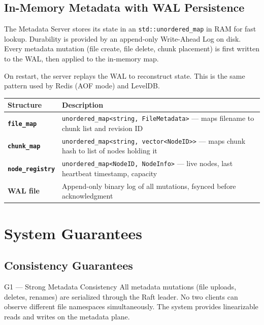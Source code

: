 \documentclass[12pt,a4paper]{article}
\begin{document}
\subsection{In-Memory Metadata with WAL Persistence}

The Metadata Server stores its state in an \texttt{std::unordered\_map} in RAM for fast lookup. Durability is provided by an append-only Write-Ahead Log on disk. Every metadata mutation (file create, file delete, chunk placement) is first written to the WAL, then applied to the in-memory map.

On restart, the server replays the WAL to reconstruct state. This is the same pattern used by Redis (AOF mode) and LevelDB.

\begin{center}
\begin{tabular}{>{\bfseries}p{4cm} p{8cm}}
\toprule
Structure & Description \\
\midrule
\texttt{file\_map} & \texttt{unordered\_map<string, FileMetadata>} — maps filename to chunk list and revision ID \\
\addlinespace
\texttt{chunk\_map} & \texttt{unordered\_map<string, vector<NodeID>>} — maps chunk hash to list of nodes holding it \\
\addlinespace
\texttt{node\_registry} & \texttt{unordered\_map<NodeID, NodeInfo>} — live nodes, last heartbeat timestamp, capacity \\
\addlinespace
WAL file & Append-only binary log of all mutations, fsynced before acknowledgment \\
\bottomrule
\end{tabular}
\end{center}

\section{System Guarantees}

\subsection{Consistency Guarantees}

\begin{guaranteebox}{G1 — Strong Metadata Consistency}
All metadata mutations (file uploads, deletes, renames) are serialized through the Raft leader. No two clients can observe different file namespaces simultaneously. The system provides linearizable reads and writes on the metadata plane.
\end{guaranteebox}
\end{document}
